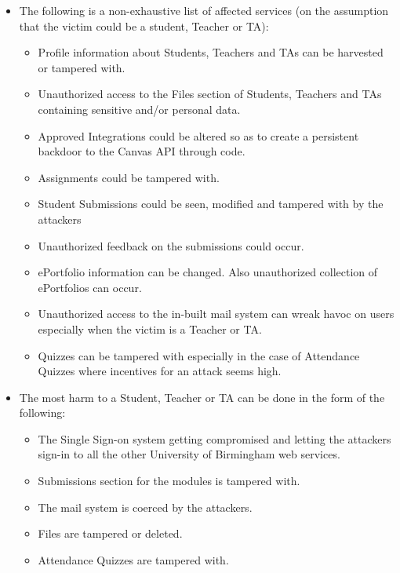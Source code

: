\documentclass[10pt,a4paper,oneside]{article}
\begin{document}
\begin{itemize}
\item The following is a non-exhaustive list of affected services (on the assumption that the victim could be a student, Teacher or TA):

\begin{itemize}
\item Profile information about Students, Teachers and TAs can be harvested or tampered with.
\item Unauthorized access to the Files section of Students, Teachers and TAs containing sensitive and/or personal data.
\item Approved Integrations could be altered so as to create a persistent backdoor to the Canvas API through code.
\item Assignments could be tampered with.
\item Student Submissions could be seen, modified and tampered with by the attackers
\item Unauthorized feedback on the submissions could occur.
\item ePortfolio information can be changed. Also unauthorized collection of ePortfolios can occur.
\item Unauthorized access to the in-built mail system can wreak havoc on users especially when the victim is a Teacher or TA.
\item Quizzes can be tampered with especially in the case of Attendance Quizzes where incentives for an attack seems high.
\end{itemize}


\item The most harm to a Student, Teacher or TA can be done in the form of the following:
\begin{itemize}
\item The Single Sign-on system getting compromised and letting the attackers sign-in to all the other University of Birmingham web services.
\item Submissions section for the modules is tampered with.
\item The mail system is coerced by the attackers.
\item Files are tampered or deleted.
\item Attendance Quizzes are tampered with.
\end{itemize}



\end{itemize}
\end{document}
